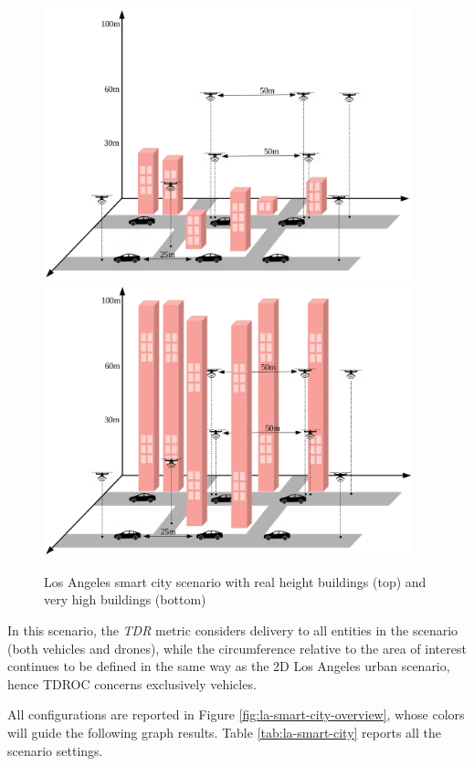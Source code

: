		\begin{figure}[H]
			\centering
			\includegraphics[width=0.95\textwidth]{immagini/la-smart-city-low}
			\includegraphics[width=0.95\textwidth]{immagini/la-smart-city-high}
			\caption{Los Angeles smart city scenario with real height buildings (top) and very high buildings (bottom)}
			\label{fig:la-smart-city}
		\end{figure}
		\newpage
		
		In this scenario, the \textit{TDR} metric considers delivery to all entities in the scenario (both vehicles and drones), while the circumference relative to the area of interest continues to be defined in the same way as the 2D Los Angeles urban scenario, hence TDROC concerns exclusively vehicles.
		
		
		All configurations are reported in Figure \ref{fig:la-smart-city-overview}, whose colors will guide the following graph results. Table \ref{tab:la-smart-city} reports all the scenario settings.
		
